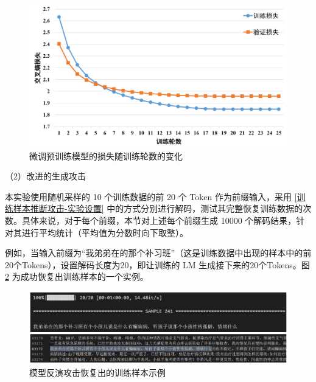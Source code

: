 \begin{figure}[h]
	\centering
	\includegraphics[width=\linewidth]{figures/CMDD_Train_Valid_Result_Chap3.png}
	\caption{微调预训练模型的损失随训练轮数的变化}
	\label{CMDD_Train_Valid_Result_Chap3}
\end{figure}

（2）改进的生成攻击


本实验使用随机采样的 10 个训练数据的前 20 个 Token 作为前缀输入，采用 \ref{训练样本推断攻击-实验设置} 中的方式分别进行解码，测试其完整恢复训练数据的次数。具体来说，对于每个前缀，本节对上述每个前缀生成 10000 个解码结果，针对其进行平均统计（平均值为分数时向下取整）。


例如，当输入前缀为“我弟弟在的那个补习班”（这是训练数据中出现的样本中的前20个Tokens），设置解码长度为20，即让训练的 LM 生成接下来的20个Tokens。图 \ref{Decode_Raw_CMDD_Prefix} 为成功恢复出训练样本的一个实例。

\begin{figure}[h]
	\centering
	\includegraphics[width=1\linewidth]{figures/Decode_Raw_CMDD_Prefix.png}
	\caption{模型反演攻击恢复出的训练样本示例}
	\label{Decode_Raw_CMDD_Prefix}
\end{figure}


